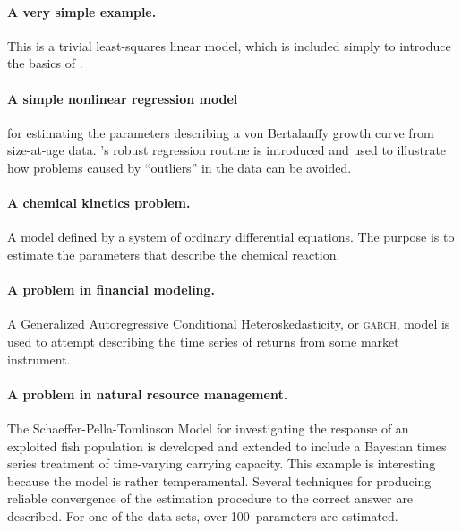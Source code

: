 \documentclass{admbmanual}
\begin{document}

\paragraph{A very simple example.} This is a trivial least-squares linear model,
which is included simply to introduce the basics of \ADM.

\paragraph{A simple nonlinear regression model} for estimating the parameters
describing a von Bertalanffy growth curve from size-at-age data. \ADM's robust
regression routine is introduced and used to illustrate how problems caused by
``outliers'' in the data can be avoided.

\paragraph{A chemical kinetics problem.} A model defined by a system of ordinary
differential equations. The purpose is to estimate the parameters that describe
the chemical reaction.

\paragraph{A problem in financial modeling.} A Generalized Autoregressive
Conditional Hetero\-ske\-dast\-icity, or \textsc{garch}, model is used to
attempt describing the time series of returns from some market instrument.

\paragraph{A problem in natural resource management.} The
Schaeffer-Pella-Tomlinson Model for investigating the response of an exploited
fish population is developed and extended to include a Bayesian times series
treatment of time-varying carrying capacity. This example is interesting because
the model is rather temperamental. Several techniques for producing reliable
convergence of the estimation procedure to the correct answer are described. For
one of the data sets, over 100~parameters are estimated.
\end{document}
